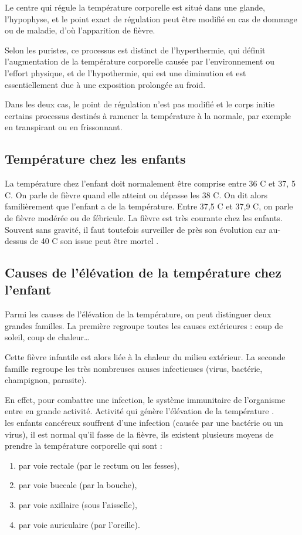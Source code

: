 \documentclass[12pt]{article}
\begin{document}
Le centre qui régule la température corporelle est situé dans une glande, l'hypophyse, et le point exact de régulation peut être modifié en cas de dommage ou de maladie, d'où l'apparition de fièvre. 

Selon les puristes, ce processus est distinct de l'hyperthermie, qui définit l'augmentation de la température corporelle causée par l'environnement ou l'effort physique, et de l'hypothermie, qui est une diminution et est essentiellement due à une exposition prolongée au froid. 

Dans les deux cas, le point de régulation n'est pas modifié et le corps initie certains processus destinés à ramener la température à la normale, par exemple en transpirant ou en frissonnant.

\subsection{Température chez les enfants}
La température chez l’enfant doit normalement être comprise entre 36 C\textdegree{} et 37, 5 C\textdegree{}. On parle de fièvre quand elle atteint ou dépasse les 38 C\textdegree{}. On dit alors familièrement que l’enfant a de la température. Entre 37,5 C\textdegree{} et 37,9 C\textdegree{}, on parle de fièvre modérée ou de fébricule. La fièvre est très courante chez les enfants. Souvent sans gravité, il faut toutefois surveiller de près son évolution car au-dessus de 40 C\textdegree{} son issue peut être mortel \cite{29}.

\subsection{Causes de l'élévation de la température chez l’enfant}
Parmi les causes de l'élévation de la température, on peut distinguer deux grandes familles. La première regroupe toutes les causes extérieures : coup de soleil, coup de chaleur… 

Cette fièvre infantile est alors liée à la chaleur du milieu extérieur. La seconde famille regroupe les très nombreuses causes infectieuses (virus, bactérie, champignon, parasite).

En effet, pour combattre une infection, le système immunitaire de l’organisme entre en grande activité. Activité qui génère l’élévation de la température \cite{30}.\\

les enfants cancéreux souffrent d’une infection (causée par une bactérie ou un virus), il est normal qu’il fasse de la fièvre, ils existent plusieurs moyens de prendre la température corporelle qui sont :
\begin{enumerate}
	\item par voie rectale (par le rectum ou les fesses),
	\item par voie buccale (par la bouche),
	\item par voie axillaire (sous l’aisselle),
	\item par voie auriculaire (par l’oreille).
\end{enumerate}
\end{document}
